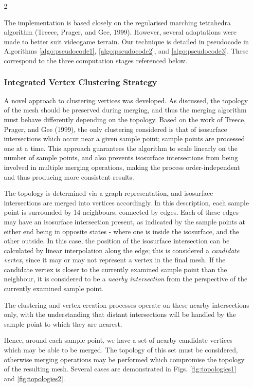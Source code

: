 \documentclass[]{article}
\begin{document}
\begin{multicols}{2}

The implementation is based closely on the regularised marching tetrahedra algorithm (Treece, Prager, and Gee, 1999). However, several adaptations were made to better suit videogame terrain. Our technique is detailed in pseudocode in Algorithms \ref{algo:pseudocode1}, \ref{algo:pseudocode2}, and \ref{algo:pseudocode3}. These correspond to the three computation stages referenced below.

\subsubsection{Integrated Vertex Clustering Strategy}\label{integrated-vertex-clustering-strategy}

A novel approach to clustering vertices was developed. As discussed, the topology of the mesh should be preserved during merging, and thus the merging algorithm must behave differently depending on the topology. Based on the work of Treece, Prager, and Gee (1999), the only clustering considered is that of isosurface intersections which occur near a given sample point; sample points are processed one at a time. This approach guarantees the algorithm to scale linearly on the number of sample points, and also prevents isosurface intersections from being involved in multiple merging operations, making the process order-independent and thus producing more consistent results.

The topology is determined via a graph representation, and isosurface intersections are merged into vertices accordingly.  In this description, each sample point is surrounded by 14 neighbours, connected by edges. Each of these edges may have an isosurface intersection present, as indicated by the sample points at either end being in opposite states - where one is inside the isosurface, and the other outside. In this case, the position of the isosurface intersection can be calculated by linear interpolation along the edge; this is considered a \emph{\textquotesingle candidate vertex\textquotesingle}, since it may or may not represent a vertex in the final mesh. If the candidate vertex is closer to the currently examined sample point than the neighbour, it is considered to be a \emph{\textquotesingle nearby intersection\textquotesingle{}} from the perspective of the currently examined sample point.

The clustering and vertex creation processes operate on these nearby intersections only, with the understanding that distant intersections will be handled by the sample point to which they are nearest.

Hence, around each sample point, we have a set of nearby candidate vertices which may be able to be merged. The topology of this set must be considered, otherwise merging operations may be performed which compromise the topology of the resulting mesh. Several cases are demonstrated in Figs. \ref{fig:topologies1} and \ref{fig:topologies2}.

\end{multicols}
\end{document}
